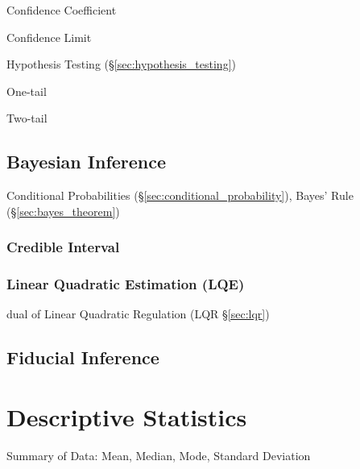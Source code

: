 Confidence Coefficient

Confidence Limit

Hypothesis Testing (\S\ref{sec:hypothesis_testing})

One-tail

Two-tail



\subsection{Bayesian Inference}\label{sec:bayesian_inference}

Conditional Probabilities (\S\ref{sec:conditional_probability}), Bayes' Rule
(\S\ref{sec:bayes_theorem})



\subsubsection{Credible Interval}\label{sec:credible_interval}

\subsubsection{Linear Quadratic Estimation (LQE)}\label{sec:lqe}

dual of Linear Quadratic Regulation (LQR \S\ref{sec:lqr})



\subsection{Fiducial Inference}\label{sec:fiducial_inference}



\section{Descriptive Statistics}\label{sec:descriptive_statistics}

Summary of Data: Mean, Median, Mode, Standard Deviation



